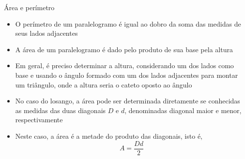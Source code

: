 \begin{frame}[fragile]{Área e perímetro}

    \begin{itemize}
        \item O perímetro de um paralelogramo é igual ao dobro da soma das medidas de 
            seus lados adjacentes
        \pause

        \item A área de um paralelogramo é dado pelo produto de sua base pela altura
        \pause

        \item Em geral, é preciso determinar a altura, considerando um dos lados como base e 
            usando o ângulo formado com um dos lados adjacentes para montar um triângulo, onde a
            altura seria o cateto oposto ao ângulo
        \pause

        \item No caso do losango, a área pode ser determinada diretamente se conhecidas as
            medidas das duas diagonais $D$ e $d$, denominadas diagonal maior e menor, 
            respectivamente
        \pause

        \item Neste caso, a área é a metade do produto das diagonais, isto é,
        \[
            A = \frac{Dd}{2}
        \]

    \end{itemize}

\end{frame}
